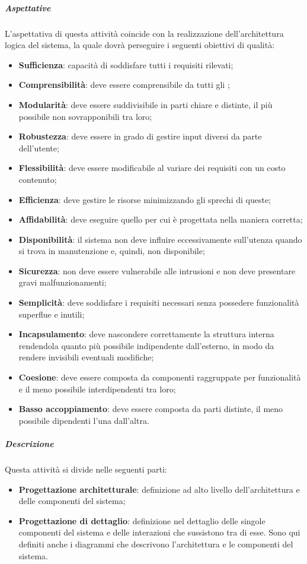 \documentclass[../norme-di-progetto.tex]{subfiles}
\begin{document}
\subparagraph{Aspettative}
L'aspettativa di questa attività coincide con la realizzazione dell'architettura logica del sistema, la quale dovrà perseguire i seguenti obiettivi di qualità:
\begin{itemize}
  \item \textbf{Sufficienza}: capacità di soddisfare tutti i requisiti rilevati;
  \item \textbf{Comprensibilità}: deve essere comprensibile da tutti gli ;
  \item \textbf{Modularità}: deve essere suddivisibile in parti chiare e distinte, il più possibile non sovrapponibili tra loro;
  \item \textbf{Robustezza}: deve essere in grado di gestire input diversi da parte dell'utente;
  \item \textbf{Flessibilità}: deve essere modificabile al variare dei requisiti con un costo contenuto;
  \item \textbf{Efficienza}: deve gestire le risorse minimizzando gli sprechi di queste;
  \item \textbf{Affidabilità}: deve eseguire quello per cui è progettata nella maniera corretta;
  \item \textbf{Disponibilità}: il sistema non deve influire eccessivamente sull'utenza quando si trova in manutenzione e, quindi, non disponibile;
  \item \textbf{Sicurezza}: non deve essere vulnerabile alle intrusioni e non deve presentare gravi malfunzionamenti;
  \item \textbf{Semplicità}: deve soddisfare i requisiti necessari senza possedere funzionalità superflue e inutili;
  \item \textbf{Incapsulamento}: deve nascondere correttamente la struttura interna rendendola quanto più possibile indipendente dall'esterno, in modo da rendere invisibili eventuali modifiche;
  \item \textbf{Coesione}: deve essere composta da componenti raggruppate per funzionalità e il meno possibile interdipendenti tra loro;
  \item \textbf{Basso accoppiamento}: deve essere composta da parti distinte, il meno possibile dipendenti l'una dall'altra.
\end{itemize}

\subparagraph{Descrizione}
Questa attività si divide nelle seguenti parti:
\begin{itemize}
  \item \textbf{Progettazione architetturale}: definizione ad alto livello dell'architettura e delle componenti del sistema;
  \item \textbf{Progettazione di dettaglio}: definizione nel dettaglio delle singole componenti del sistema e delle interazioni che sussistono tra di esse. Sono qui definiti anche i diagrammi che descrivono l'architettura e le componenti del sistema.
\end{itemize}
\end{document}
